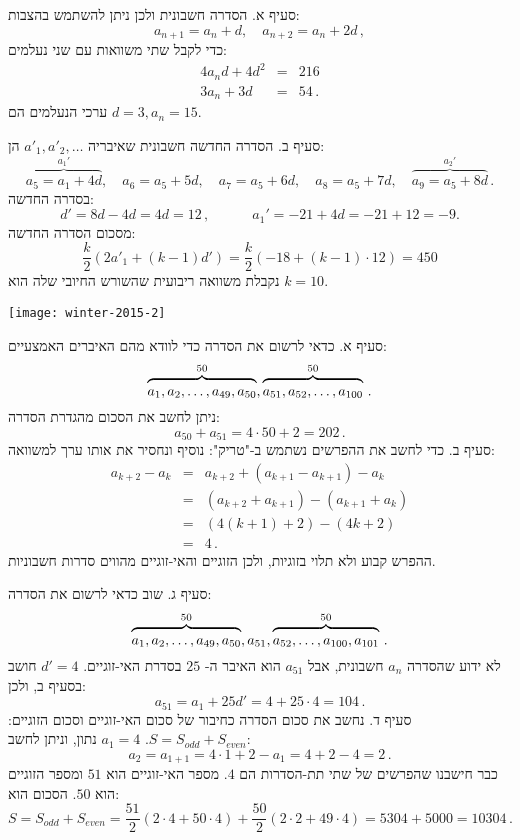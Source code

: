 סעיף א. הסדרה חשבונית ולכן ניתן להשתמש בהצבות:
\[
a_{n+1}=a_n+d, \quad a_{n+2}=a_n+2d\,,
\]
כדי לקבל שתי משוואות עם שני נעלמים:
\begin{eqnarray*}
4a_nd+4d^2 &=& 216\\
3a_n + 3d &=& 54\,.
\end{eqnarray*}
ערכי הנעלמים הם
$d=3,a_n=15$.

סעיף ב. הסדרה החדשה חשבונית שאיבריה 
$a'_1, a'_2,\ldots$
הן:
\[
\overbrace{a_5=a_1+4d}^{a_1'}, \quad a_6=a_5+5d,\quad  a_7=a_5+6d,\quad  a_8=a_5+7d,\quad  \overbrace{a_9=a_5+8d}^{a_2'}\,.
\]
בסדרה החדשה:
\[
d' = 8d-4d = 4d = 12\,,\quad\quad\quad a_1' = -21 + 4d= -21 + 12 = -9.
\]
מסכום הסדרה החדשה:
\[
\frac{k}{2}(2a'_1 + (k-1)d')=\frac{k}{2}(-18+(k-1)\cdot 12)=450
\]
נקבלת משוואה ריבועית שהשורש החיובי שלה הוא
$k=10$.


\bigskip

\textbf{}

\begin{center}
\texttt{[image: winter-2015-2]}
\end{center}
\vspace{-1ex}

סעיף א. כדאי לרשום את הסדרה כדי לוודא מהם האיברים האמצעיים:
\[
\overbrace{\rule{0pt}{8pt}a_1, a_2, \ldots, a_{49}, a_{50}}^{50}, \overbrace{\rule{0pt}{8pt}a_{51}, a_{52},\ldots, a_{100}}^{50}\,.
\]
ניתן לחשב את הסכום מהגדרת הסדרה:
\[
a_{50}+a_{51}=4\cdot 50+2=202\,.
\]
סעיף ב. כדי לחשב את ההפרשים נשתמש ב-"טריק": נוסיף ונחסיר את אותו ערך למשוואה:
\begin{eqnarray*}
a_{k+2} - a_{k} &=& a_{k+2}+(a_{k+1}-a_{k+1})-a_{k}\\
&=& (a_{k+2}+a_{k+1})-(a_{k+1}+a_{k})\\
&=& (4(k+1)+2)-(4k+2)\\
&=&4\,.
\end{eqnarray*}
ההפרש קבוע ולא תלוי בזוגיות, ולכן הזוגיים והאי-זוגיים מהווים סדרות חשבוניות.

סעיף ג. שוב כדאי לרשום את הסדרה:
\[
\overbrace{\rule{0pt}{8pt}a_1, a_2, \ldots, a_{49}, a_{50}}^{50}, a_{51}, \overbrace{\rule{0pt}{8pt}a_{52}, \ldots, a_{100}, a_{101}}^{50}\,.
\]
לא ידוע שהסדרה
$a_{n}$
חשבונית, אבל
$a_{51}$
הוא האיבר ה-%
$25$
בסדרת האי-זוגיים.
$d'=4$
חושב בסעיף ב, ולכן:
\[
a_{51}=a_1+25d' =4+25\cdot 4=104\,.
\]
סעיף ד. נחשב את סכום הסדרה כחיבור של סכום האי-זוגיים וסכום הזוגיים:
$S=S_{\mathit{odd}} + S_{\mathit{even}}$.
$a_1=4$
נתון, וניתן לחשב:
\[
a_2=a_{1+1}=4\cdot 1+2-a_1=4+2-4=2\,.
\]
כבר חישבנו שהפרשים של שתי תת-הסדרות הם 
$4$.
מספר האי-זוגיים הוא
$51$
ומספר הזוגיים הוא
$50$.
הסכום הוא:
\[
S=S_{\mathit{odd}} + S_{\mathit{even}}=\frac{51}{2}(2\cdot 4+50\cdot 4)+\frac{50}{2}(2\cdot 2+49\cdot 4)=5304+5000=10304\,.
\]
\vspace{-4ex}

